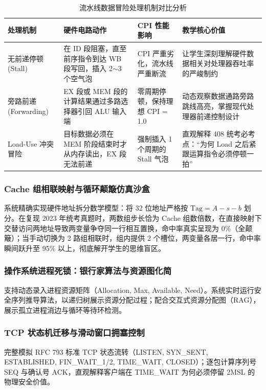 \documentclass[UTF8,a4paper,11pt]{ctexart}
\begin{document}
\begin{table}[htbp]
\centering
\small
\caption{流水线数据冒险处理机制对比分析}
\begin{tabularx}{\textwidth}{p{2.8cm}Xp{2.8cm}p{4cm}}
\toprule
\textbf{处理机制} & \textbf{硬件电路动作} & \textbf{CPI 性能影响} & \textbf{教学核心价值} \\
\midrule
无前递停顿 (Stall) & 在 ID 段阻塞，直至前序指令到达 WB 段写回，插入 2$\sim$3 个空气泡 & CPI 严重劣化，流水线严重断流 & 让学生深刻理解硬件数据相关对处理器吞吐率的严峻制约 \\
旁路前递 (Forwarding) & EX 段或 MEM 段的计算结果通过多路选择器引回 ALU 输入端 & 零周期停顿，保持理想 CPI = 1.0 & 动态观察数据通路旁路跳线高亮，掌握现代处理器前递控制设计 \\
Load-Use 冲突冒险 & 目标数据必须在 MEM 阶段结束时才从内存读出，EX 段无法前递 & 强制插入 1 个周期的 Stall 气泡 & 直观解释 408 统考必考点：“为何 Load 之后紧跟运算指令必须停顿一拍” \\
\bottomrule
\end{tabularx}
\end{table}

\subsubsection{Cache 组相联映射与循环颠簸仿真沙盒}
系统精确实现硬件地址拆分数学模型：将 32 位地址严格按 $\text{Tag} = A - s - b$ 划分。在复现 2023 年统考真题时，两数组步长恰为 Cache 组数倍数，在直接映射下交替访问两地址导致两变量争夺同一行相互置换，命中率真实呈现为 0\%（全颠簸）；当手动切换为 2 路组相联时，组内提供 2 个槽位，两变量各居一行，命中率瞬间跃升至 95\% 以上，彻底解开学生的思维盲区。

\subsubsection{操作系统进程死锁：银行家算法与资源图化简}
支持动态录入进程资源矩阵（Allocation, Max, Available, Need）。系统实时运行安全序列推导算法，以递归树展示资源分配过程；配合交互式资源分配图（RAG），展示孤立进程消边与循环等待环检测。

\subsubsection{TCP 状态机迁移与滑动窗口拥塞控制}
完整模拟 RFC 793 标准 TCP 状态流转（LISTEN, SYN\_SENT, ESTABLISHED, FIN\_WAIT\_1/2, TIME\_WAIT, CLOSED）；逐包计算序列号 SEQ 与确认号 ACK，直观解释客户端在 TIME\_WAIT 为何必须停留 2MSL 的物理安全价值。
\end{document}
